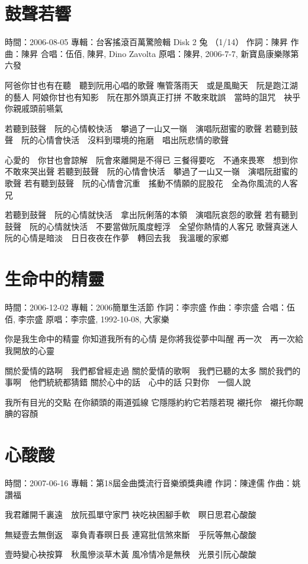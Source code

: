 \documentclass[UTF8,a4paper,oneside,twocolumn,12pt]{ctexbook}
\newcommand{\infopair}[2]{\textbullet #1：#2}
\newcommand{\zc}[1][伍佰]{\infopair{作詞}{#1}}
\newcommand{\zq}[1][伍佰]{\infopair{作曲}{#1}}
\newcommand{\zj}[1]{\infopair{專輯}{#1}}
\newcommand{\yc}[1]{\infopair{原唱}{#1}}
\newcommand{\sj}[1]{\infopair{時間}{#1}}
\newenvironment{info}{\begin{flushleft}\kaishu
	}
	{\end{flushleft}\normalsize\yahei\par}
\newenvironment{lyric}{
	}
{}
\begin{document}
\section{鼓聲若響}
\begin{info}
	\sj{2006-08-05}
	\zj{台客搖滾百萬驚險輯 Disk 2 兔 （1/14）}
	\zc[陳昇]
	\zq[陳昇]
	\infopair{合唱}{伍佰, 陳昇, Dino Zavolta}
	\yc{陳昇, 2006-7-7, 新寶島康樂隊第六發}
\end{info}
\begin{lyric}
	阿爸你甘也有在聽　聽到阮用心唱的歌聲
	嘸管落雨天　或是風颱天　阮是跑江湖的藝人
	阿娘你甘也有知影　阮在那外頭真正打拼
	不敢來耽誤　當時的詛咒　袂乎你親戚頭前嚥氣

	若聽到鼓聲　阮的心情較快活　攀過了一山又一嶺　演唱阮甜蜜的歌聲
	若聽到鼓聲　阮的心情會快活　沒料到環境的拖磨　唱出阮悲情的歌聲

	心愛的　你甘也會諒解　阮會來離開是不得已
	三餐得要吃　不通來畏寒　想到你不敢來哭出聲
	若聽到鼓聲　阮的心情會快活　攀過了一山又一嶺　演唱阮甜蜜的歌聲
	若有聽到鼓聲　阮的心情會沉重　搖動不情願的屁股花　全為你風流的人客兄

	若聽到鼓聲　阮的心情就快活　拿出阮俐落的本領　演唱阮哀怨的歌聲
	若有聽到鼓聲　阮的心情就快活　不要當做阮風度輕浮　全望你熱情的人客兄
	歌聲真迷人　阮的心情是暗淡　日日夜夜在作夢　轉回去我　我溫暖的家鄉
\end{lyric}

\section{生命中的精靈}
\begin{info}
	\sj{2006-12-02}
	\zj{2006簡單生活節}
	\zc[李宗盛]
	\zq[李宗盛]
	\infopair{合唱}{伍佰, 李宗盛}
	\yc{李宗盛, 1992-10-08, 大家樂}
\end{info}
\begin{lyric}
	你是我生命中的精靈
	你知道我所有的心情
	是你將我從夢中叫醒
	再一次　再一次給我開放的心靈

	關於愛情的路啊　我們都曾經走過
	關於愛情的歌啊　我們已聽的太多
	關於我們的事啊　他們統統都猜錯
	關於心中的話　心中的話
	只對你　一個人說

	我所有目光的交點
	在你額頭的兩道弧線
	它隱隱約約它若隱若現
	襯托你　襯托你靦腆的容顏
\end{lyric}

\section{心酸酸}
\begin{info}
	\sj{2007-06-16}
	\zj{第18屆金曲獎流行音樂頒獎典禮}
	\zc[陳達儒]
	\zq[姚讚福]
\end{info}
\begin{lyric}
	我君離開千裏遠　放阮孤單守家門
	袂吃袂困腳手軟　瞑日思君心酸酸

	無疑壹去無倒返　辜負青春暝日長
	連寫批信煞來斷　乎阮等無心酸酸

	壹時變心袂按算　秋風慘淡草木黃
	風冷情冷是無秧　光景引阮心酸酸
\end{lyric}
\end{document}

